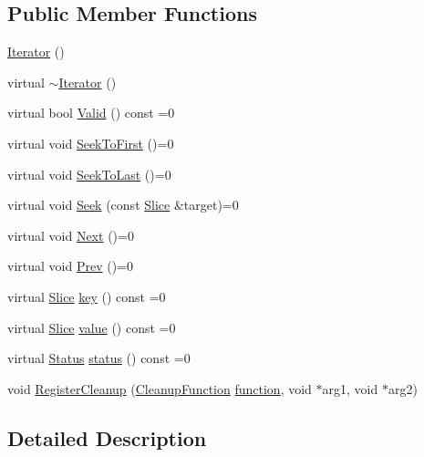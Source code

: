 \subsection*{Public Member Functions}
\begin{DoxyCompactItemize}
\item 
\hyperlink{classleveldb_1_1_iterator_a1dc1cbc893e55a3fc990f08cf191480a}{Iterator} ()
\item 
virtual \hyperlink{classleveldb_1_1_iterator_a2c9ce32aa57b2202d1e0d4a38c2676a1}{$\sim$\+Iterator} ()
\item 
virtual bool \hyperlink{classleveldb_1_1_iterator_a38614978bfa0586327b8e237bcb46012}{Valid} () const =0
\item 
virtual void \hyperlink{classleveldb_1_1_iterator_a3594967cf26ddf1d37c7b886bb48627e}{Seek\+To\+First} ()=0
\item 
virtual void \hyperlink{classleveldb_1_1_iterator_a8ad637f0a759e6d94cca6c5b4db440d3}{Seek\+To\+Last} ()=0
\item 
virtual void \hyperlink{classleveldb_1_1_iterator_a97a556e97ded60c677fbf4de7321ec44}{Seek} (const \hyperlink{classleveldb_1_1_slice}{Slice} \&target)=0
\item 
virtual void \hyperlink{classleveldb_1_1_iterator_aea54a5ca7eb942eb15770820529410e7}{Next} ()=0
\item 
virtual void \hyperlink{classleveldb_1_1_iterator_a28798d802a203788587dc6adc5bc729e}{Prev} ()=0
\item 
virtual \hyperlink{classleveldb_1_1_slice}{Slice} \hyperlink{classleveldb_1_1_iterator_ad17feced6e24a1b21db5ae6940c1f220}{key} () const =0
\item 
virtual \hyperlink{classleveldb_1_1_slice}{Slice} \hyperlink{classleveldb_1_1_iterator_a613ac2e965518aad7a064c64c72bcf7c}{value} () const =0
\item 
virtual \hyperlink{classleveldb_1_1_status}{Status} \hyperlink{classleveldb_1_1_iterator_ac84f34623a031b7eeb23409320f76376}{status} () const =0
\item 
void \hyperlink{classleveldb_1_1_iterator_a8c0281f9e4a2c9dceb37aad8128b636f}{Register\+Cleanup} (\hyperlink{classleveldb_1_1_iterator_ae40c9eedd82a722d24fde1fd8bee4afa}{Cleanup\+Function} \hyperlink{env__posix_8cc_afb29d621bb8c12b62eefbb220cab360b}{function}, void $\ast$arg1, void $\ast$arg2)
\end{DoxyCompactItemize}


\subsection{Detailed Description}


